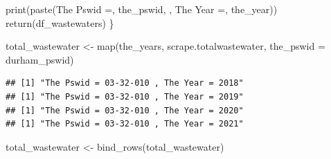 \documentclass[
  12pt,
]{article}
\newenvironment{Shaded}{\begin{snugshade}}{\end{snugshade}}
\newcommand{\AttributeTok}[1]{\textcolor[rgb]{0.77,0.63,0.00}{#1}}
\newcommand{\FunctionTok}[1]{\textcolor[rgb]{0.00,0.00,0.00}{#1}}
\newcommand{\NormalTok}[1]{#1}
\newcommand{\OtherTok}[1]{\textcolor[rgb]{0.56,0.35,0.01}{#1}}
\newcommand{\StringTok}[1]{\textcolor[rgb]{0.31,0.60,0.02}{#1}}
\begin{document}
\begin{Shaded}
\begin{Highlighting}[]
  \FunctionTok{print}\NormalTok{(}\FunctionTok{paste}\NormalTok{(}\StringTok{\textquotesingle{}The Pswid =\textquotesingle{}}\NormalTok{, the\_pswid, }\StringTok{\textquotesingle{}, The Year =\textquotesingle{}}\NormalTok{, the\_year))}
  \FunctionTok{return}\NormalTok{(df\_wastewaters)}
\NormalTok{\}}

\NormalTok{total\_wastewater }\OtherTok{\textless{}{-}} \FunctionTok{map}\NormalTok{(the\_years, scrape.totalwastewater, }\AttributeTok{the\_pswid =}\NormalTok{ durham\_pswid)}
\end{Highlighting}
\end{Shaded}

\begin{verbatim}
## [1] "The Pswid = 03-32-010 , The Year = 2018"
## [1] "The Pswid = 03-32-010 , The Year = 2019"
## [1] "The Pswid = 03-32-010 , The Year = 2020"
## [1] "The Pswid = 03-32-010 , The Year = 2021"
\end{verbatim}

\begin{Shaded}
\begin{Highlighting}[]
\NormalTok{total\_wastewater }\OtherTok{\textless{}{-}} \FunctionTok{bind\_rows}\NormalTok{(total\_wastewater)}
\end{Highlighting}
\end{Shaded}
\end{document}
